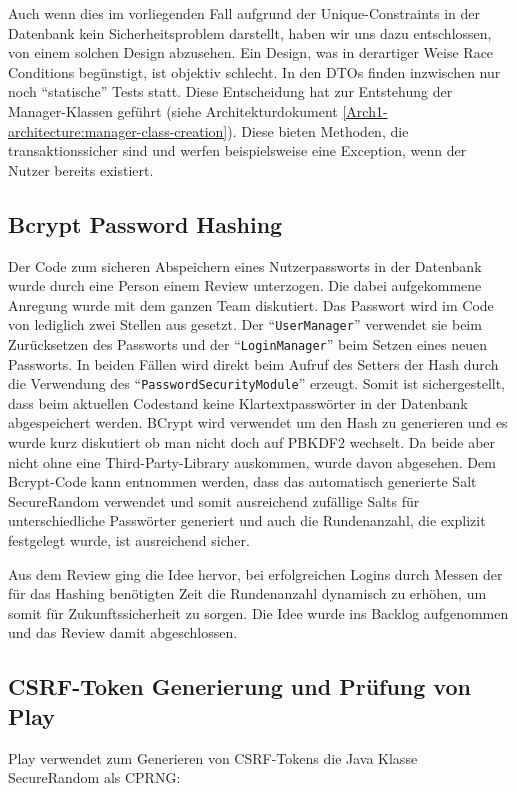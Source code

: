 \documentclass[12pt,DIV14,BCOR10mm,a4paper,parskip=half-,headsepline,headinclude,english,ngerman,bibliography=totocnumbered]{scrreprt}
\begin{document}
Auch wenn dies im vorliegenden Fall aufgrund der Unique-Constraints in der Datenbank kein Sicherheitsproblem darstellt, haben wir uns dazu entschlossen, von einem solchen Design abzusehen. Ein Design, was in derartiger Weise Race Conditions begünstigt, ist objektiv schlecht. In den DTOs finden inzwischen nur noch \enquote{statische} Tests statt. Diese Entscheidung hat zur Entstehung der Manager-Klassen geführt (siehe Architekturdokument \ref{Arch1-architecture:manager-class-creation}). Diese bieten Methoden, die transaktionssicher sind und werfen beispielsweise eine Exception, wenn der Nutzer bereits existiert.

\subsection{Bcrypt Password Hashing}
Der Code zum sicheren Abspeichern eines Nutzerpassworts in der Datenbank wurde durch eine Person einem Review unterzogen. Die dabei aufgekommene Anregung wurde mit dem ganzen Team diskutiert. Das Passwort wird im Code von lediglich zwei Stellen aus gesetzt. Der \enquote{\texttt{UserManager}} verwendet sie beim Zurücksetzen des Passworts und der \enquote{\texttt{LoginManager}} beim Setzen eines neuen Passworts. In beiden Fällen wird direkt beim Aufruf des Setters der Hash durch die Verwendung des \enquote{\texttt{PasswordSecurityModule}} erzeugt. Somit ist sichergestellt, dass beim aktuellen Codestand keine Klartextpasswörter in der Datenbank abgespeichert werden. BCrypt wird verwendet um den Hash zu generieren und es wurde kurz diskutiert ob man nicht doch auf PBKDF2 wechselt. Da beide aber nicht ohne eine Third-Party-Library auskommen, wurde davon abgesehen. Dem Bcrypt-Code \autocite{BcryptCode} kann entnommen werden, dass das automatisch generierte Salt SecureRandom verwendet und somit ausreichend zufällige Salts für unterschiedliche Passwörter generiert und auch die Rundenanzahl, die explizit festgelegt wurde, ist ausreichend sicher.

Aus dem Review ging die Idee hervor, bei erfolgreichen Logins durch Messen der für das Hashing benötigten Zeit die Rundenanzahl dynamisch zu erhöhen, um somit für Zukunftssicherheit zu sorgen. Die Idee wurde ins Backlog aufgenommen und das Review damit abgeschlossen.



\subsection{CSRF-Token Generierung und Prüfung von Play}
Play verwendet zum Generieren von CSRF-Tokens die Java Klasse SecureRandom als CPRNG:
\end{document}

